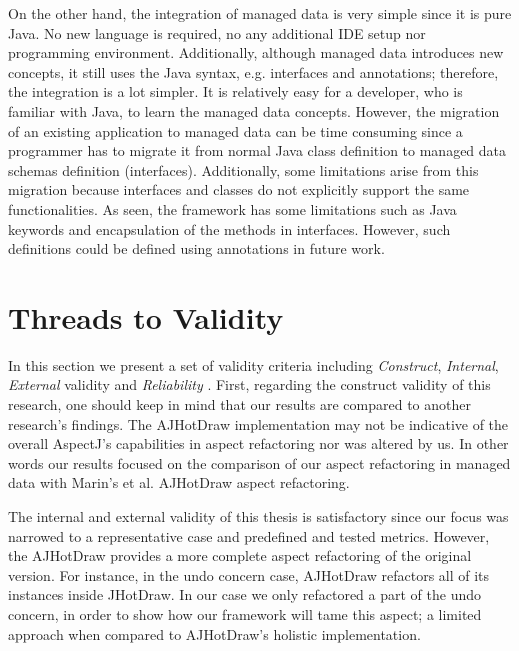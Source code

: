 On the other hand, the integration of managed data is very simple since it is pure Java.
No new language is required, no any additional IDE setup nor programming environment.
Additionally, although managed data introduces new concepts, it still uses the Java syntax, e.g. interfaces and annotations; therefore, the integration is a lot simpler.
It is relatively easy for a developer, who is familiar with Java, to learn the managed data concepts.
However, the migration of an existing application to managed data can be time consuming since a programmer has to migrate it from normal Java class definition  to managed data schemas definition (interfaces).
Additionally, some limitations arise from this migration because interfaces and classes do not explicitly support the same functionalities.
As seen, the framework has some limitations such as Java keywords and encapsulation of the methods in interfaces.
However, such definitions could be defined using annotations in future work.


\section{Threads to Validity}
In this section we present a set of validity criteria including \textit{Construct}, \textit{Internal}, \textit{External} validity and \textit{Reliability} \cite{easterbrook2008selecting}.
First, regarding the construct validity of this research, one should keep in mind that our results are compared to another research's findings. 
The AJHotDraw implementation may not be indicative of the overall AspectJ's capabilities in aspect refactoring nor was altered by us.
In other words our results focused on the comparison of our aspect refactoring in managed data with Marin's et al. AJHotDraw aspect refactoring.

The internal and external validity of this thesis is satisfactory since our focus was narrowed to a representative case and predefined and tested metrics.
However, the AJHotDraw provides a more complete aspect refactoring of the original version.
For instance, in the undo concern case, AJHotDraw refactors all of its instances inside JHotDraw. 
In our case we only refactored a part of the undo concern, in order to show how our framework will tame this aspect; a limited approach when compared to AJHotDraw's holistic implementation.

